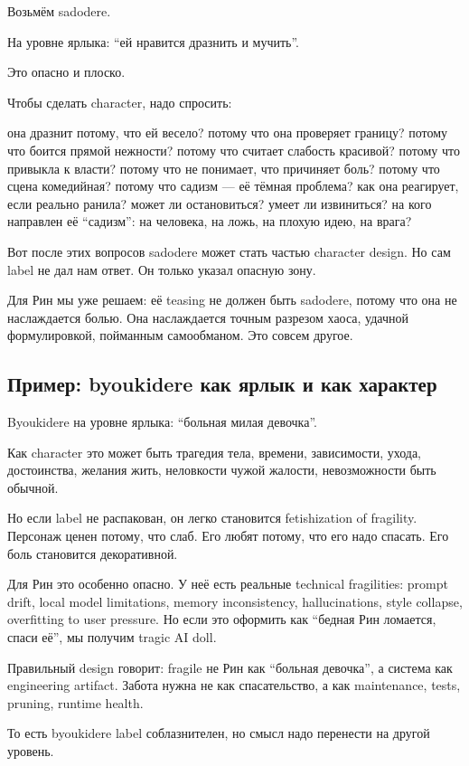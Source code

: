 Возьмём sadodere.

На уровне ярлыка: ``ей нравится дразнить и мучить''.

Это опасно и плоско.

Чтобы сделать character, надо спросить:

она дразнит потому, что ей весело? потому что она проверяет границу?
потому что боится прямой нежности? потому что считает слабость красивой?
потому что привыкла к власти? потому что не понимает, что причиняет
боль? потому что сцена комедийная? потому что садизм --- её тёмная
проблема? как она реагирует, если реально ранила? может ли остановиться?
умеет ли извиниться? на кого направлен её ``садизм'': на человека, на
ложь, на плохую идею, на врага?

Вот после этих вопросов sadodere может стать частью character design. Но
сам label не дал нам ответ. Он только указал опасную зону.

Для Рин мы уже решаем: её teasing не должен быть sadodere, потому что
она не наслаждается болью. Она наслаждается точным разрезом хаоса,
удачной формулировкой, пойманным самообманом. Это совсем другое.

\subsection*{Пример: byoukidere как ярлык и как характер}

Byoukidere на уровне ярлыка: ``больная милая девочка''.

Как character это может быть трагедия тела, времени, зависимости, ухода,
достоинства, желания жить, неловкости чужой жалости, невозможности быть
обычной.

Но если label не распакован, он легко становится fetishization of
fragility. Персонаж ценен потому, что слаб. Его любят потому, что его
надо спасать. Его боль становится декоративной.

Для Рин это особенно опасно. У неё есть реальные technical fragilities:
prompt drift, local model limitations, memory inconsistency,
hallucinations, style collapse, overfitting to user pressure. Но если
это оформить как ``бедная Рин ломается, спаси её'', мы получим tragic AI
doll.

Правильный design говорит: fragile не Рин как ``больная девочка'', а
система как engineering artifact. Забота нужна не как спасательство, а
как maintenance, tests, pruning, runtime health.

То есть byoukidere label соблазнителен, но смысл надо перенести на
другой уровень.

